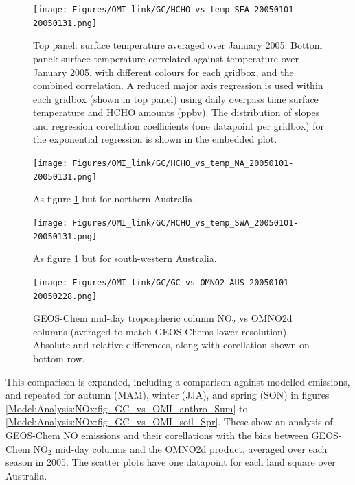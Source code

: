     
    \begin{figure}
      \texttt{[image: Figures/OMI\_link/GC/HCHO\_vs\_temp\_SEA\_20050101-20050131.png]}
      \caption{%
        Top panel: surface temperature averaged over January 2005.
        Bottom panel: surface temperature correlated against temperature over January 2005, with different colours for each gridbox, and the combined correlation. 
        A reduced major axis regression is used within each gridbox (shown in top panel) using daily overpass time surface temperature and HCHO amounts (ppbv).
        The distribution of slopes and regression corellation coefficients (one datapoint per gridbox) for the exponential regression is shown in the embedded plot.
      }
      \label{Model:Analysis:HCHO:fig_hcho_vs_temp_SEA_200501}
    \end{figure}
    
    \begin{figure}
      \texttt{[image: Figures/OMI\_link/GC/HCHO\_vs\_temp\_NA\_20050101-20050131.png]}
      \caption{%
        As figure \ref{Model:Analysis:HCHO:fig_hcho_vs_temp_SEA_200501} but for northern Australia.
      }
      \label{Model:Analysis:HCHO:fig_hcho_vs_temp_NA_200501}
    \end{figure}
    
    \begin{figure}
      \texttt{[image: Figures/OMI\_link/GC/HCHO\_vs\_temp\_SWA\_20050101-20050131.png]}
      \caption{%
        As figure \ref{Model:Analysis:HCHO:fig_hcho_vs_temp_SEA_200501} but for south-western Australia.
      }
      \label{Model:Analysis:HCHO:fig_hcho_vs_temp_SWA_200501}
    \end{figure}
    
    
    \begin{figure}
      \texttt{[image: Figures/OMI\_link/GC/GC\_vs\_OMNO2\_AUS\_20050101-20050228.png]}
      \caption{%
        GEOS-Chem mid-day tropospheric column NO$_2$ vs OMNO2d columns (averaged to match GEOS-Chems lower resolution).
        Absolute and relative differences, along with corellation shown on bottom row.
      }
      \label{Model:Analysis:NOx:fig_GC_vs_OMNO2d_AUS_Sum_2005}
    \end{figure}
    
    This comparison is expanded, including a comparison against modelled emissions, and repeated for autumn (MAM), winter (JJA), and spring (SON) in figures \ref{Model:Analysis:NOx:fig_GC_vs_OMI_anthro_Sum} to \ref{Model:Analysis:NOx:fig_GC_vs_OMI_soil_Spr}.
    These show an analysis of GEOS-Chem NO emissions and their corellations with the bias between GEOS-Chem NO$_2$ mid-day columns and the OMNO2d product, averaged over each season in 2005.
    The scatter plots have one datapoint for each land square over Australia.
    
